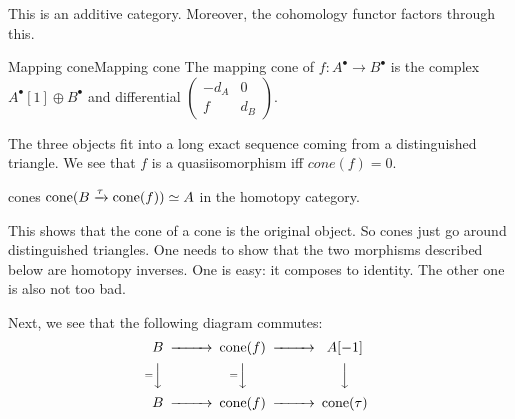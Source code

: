 This is an additive category. Moreover, the cohomology functor factors through this.

\begin{definition}{Mapping cone}{Mapping cone}
    The mapping cone of $f:A^\bullet\to B^\bullet$ is the complex $A^\bullet[1]\oplus B^\bullet$ and differential $\begin{pmatrix} -d_A & 0 \\ f & d_B
\end{pmatrix}$.\end{definition}

The three objects fit into a long exact sequence coming from a distinguished triangle. We see that $f$ is a quasiisomorphism iff $cone(f)=0$.

\begin{proposition}{}{cones}
    $\operatorname{cone}(B\xrightarrow{\tau} \operatorname{cone}(f))\simeq A$ in the homotopy category.
\end{proposition}

This shows that the cone of a cone is the original object. So cones just go around distinguished triangles. One needs to show that the two morphisms described below are homotopy inverses. One is easy: it composes to identity. The other one is also not too bad.


Next, we see that the following diagram commutes:$$\begin{CD} B @> > > \cone(f)@> > > A[-1] \\ @V=VV @V=VV @VVV\\B @> > > \cone(f) @> > > \cone(\tau)\end{CD}$$


